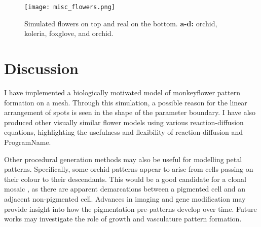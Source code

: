 \begin{figure}[p]
	\centering
	\texttt{[image: misc\_flowers.png]}
	\caption{Simulated flowers on top and real on the bottom. \textbf{a-d:} orchid, koleria, foxglove, and orchid.}
	\label{fig:miscFlowers}
\end{figure}

\section{Discussion}

I have implemented a biologically motivated model of monkeyflower pattern formation on a mesh. Through this simulation, a possible reason for the linear arrangement of spots is seen in the shape of the parameter boundary. I have also produced other visually similar flower models using various reaction-diffusion equations, highlighting the usefulness and flexibility of reaction-diffusion and ProgramName{}.

Other procedural generation methods may also be useful for modelling petal patterns. Specifically, some orchid patterns appear to arise from cells passing on their colour to their descendants. This would be a good candidate for a clonal mosaic \citep{korn2007}, as there are apparent demarcations between a pigmented cell and an adjacent non-pigmented cell. Advances in imaging and gene modification may provide insight into how the pigmentation pre-patterns develop over time. Future works may investigate the role of growth and vasculature pattern formation.